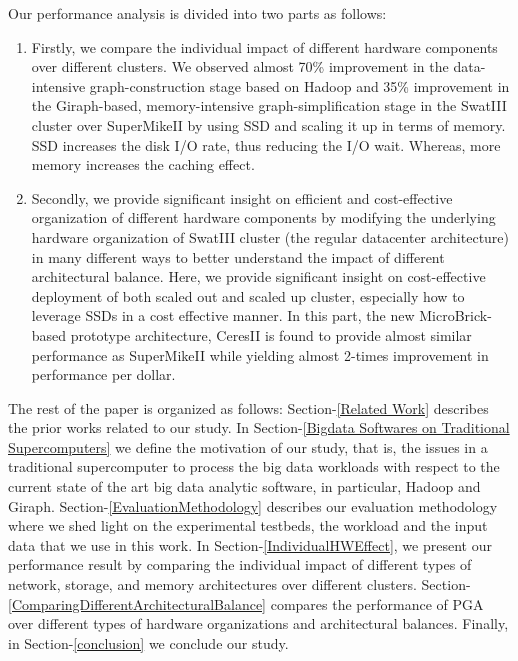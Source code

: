 \documentclass[conference]{IEEEtran}
\begin{document}
Our performance analysis is divided into two parts as follows: 
\begin{enumerate}
\item Firstly, we compare the individual impact of different hardware components over different clusters. We observed almost 70\% improvement in the data-intensive graph-construction stage based on Hadoop and 35\% improvement in the Giraph-based, memory-intensive graph-simplification stage in the SwatIII cluster over SuperMikeII by using SSD and scaling it up in terms of memory. SSD increases the disk I/O rate, thus reducing the I/O wait. Whereas, more memory increases the caching effect. 
\item Secondly, we provide significant insight on efficient and cost-effective organization of different hardware components by modifying the underlying hardware organization of SwatIII cluster (the regular datacenter architecture) in many different ways to better understand the impact of different architectural balance. Here, we provide significant insight on cost-effective deployment of both scaled out and scaled up cluster, especially how to leverage SSDs in a cost effective manner. 
In this part, the new MicroBrick-based prototype architecture, CeresII is found to provide almost similar performance as SuperMikeII while yielding almost 2-times improvement in performance per dollar. 
\end{enumerate}

The rest of the paper is organized as follows:
Section-\ref{Related Work} describes the prior works related to our study. 
In Section-\ref{Bigdata Softwares on Traditional Supercomputers} we define the motivation of our study, that is, the issues in a traditional supercomputer to process the big data workloads with respect to the current state of the art big data analytic software, in particular, Hadoop and Giraph. 
Section-\ref{EvaluationMethodology} describes our evaluation methodology where we shed light on the experimental testbeds, the workload and the input data that we use in this work. 
In Section-\ref{IndividualHWEffect}, we present our performance result by comparing the individual impact of different types of network, storage, and memory architectures over different clusters. 
Section-\ref{ComparingDifferentArchitecturalBalance} compares the performance of PGA over different types of hardware organizations and architectural balances. Finally, in Section-\ref{conclusion} we conclude our study. 
\end{document}
